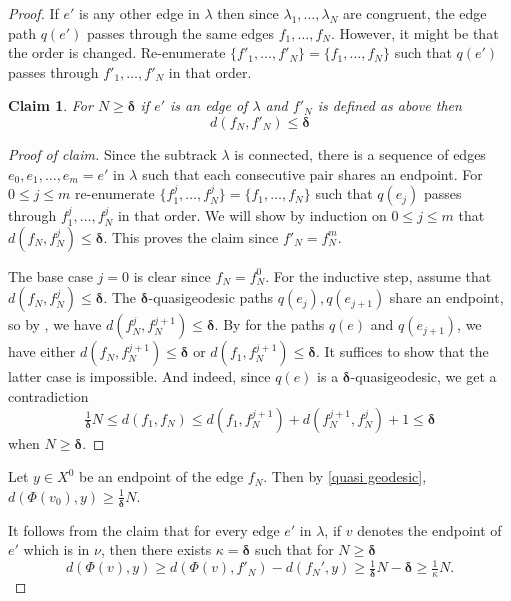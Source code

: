 \documentclass{amsart}
\numberwithin{equation}{section}
\newtheorem*{claim*}{Claim}
\theoremstyle{definition}
\newcommand{\bdelta}{{\boldsymbol\delta}}
\begin{document}
\begin{proof}
If $e'$ is any other edge in $\lambda$ then since $\lambda_1,\dots,\lambda_N$ are congruent, the edge path $q(e')$ passes through the same edges $f_1,\dots,f_N$. However, it might be that the order is changed. Re-enumerate $\{f'_1,\dots,f'_N\} = \{f_1,\dots,f_N\}$ such that $q(e')$ passes through $f'_1,\dots,f'_N$ in that order.

\begin{claim*} For $N\ge \bdelta$ if $e'$ is an edge of $\lambda$ and $f'_N$ is defined as above then 
\begin{equation}\label{eq: endpoint are close} d(f_N,f'_N)\le \bdelta\end{equation}
\end{claim*}
\begin{proof}[Proof of claim]
Since the subtrack $\lambda$ is connected, there is a sequence of edges $e_0,e_1,\dots,e_m=e'$ in $\lambda$ such that each consecutive pair shares an endpoint. For $0\le j \le m$ re-enumerate $\{f_1^j,\dots,f_N^j\} = \{f_1,\dots,f_N\}$ such that $q(e_j)$ passes through $f_1^j,\dots,f_N^j$ in that order. We will show by induction on $0\le j\le m$ that $d(f_N, f^j_N)\le\bdelta$. This proves the claim since $f'_N = f^m_N$.

The base case $j=0$ is clear since $f_N = f^0_N$. 
For the inductive step, assume that $d(f_N,f^j_N)\le \bdelta$. 
The $\bdelta$-quasigeodesic paths $q(e_j),q(e_{j+1})$ share an endpoint, so by , we have $d(f_N^j,f_N^{j+1})\le \bdelta$. 
By  for the paths $q(e)$ and $q(e_{j+1})$, we have either $d(f_N,f_N^{j+1})\le \bdelta$ or $d(f_1,f_N^{j+1})\le \bdelta$. It suffices to show that the latter case is impossible. And indeed, since $q(e)$ is a $\bdelta$-quasigeodesic, we get a contradiction $$\tfrac 1 \bdelta N \le d(f_1,f_N) \le d(f_1,f_N^{j+1}) + d(f_N^{j+1},f_N^j)+1\le \bdelta$$ when $N\ge \bdelta$.
\end{proof}



Let $y \in X^0$ be an endpoint of the edge $f_N$.
Then by \ref{quasi geodesic}, $d(\Phi(v_0),y) \ge \tfrac 1\bdelta N$.

It follows from the claim that for every edge $e'$ in $\lambda$, if $v$ denotes the endpoint of $e'$ which is in $\nu$, then there exists $\kappa = \bdelta$ such that for $N\ge \bdelta$
\begin{equation}\label{eq: lower bound on length of edges of lambda'}
    d(\Phi(v),y) \ge d(\Phi(v),f'_N)-d(f_N',y)\ge \tfrac 1\bdelta N - \bdelta\ge \tfrac 1\kappa N.
\end{equation}


\end{proof}
\end{document}
